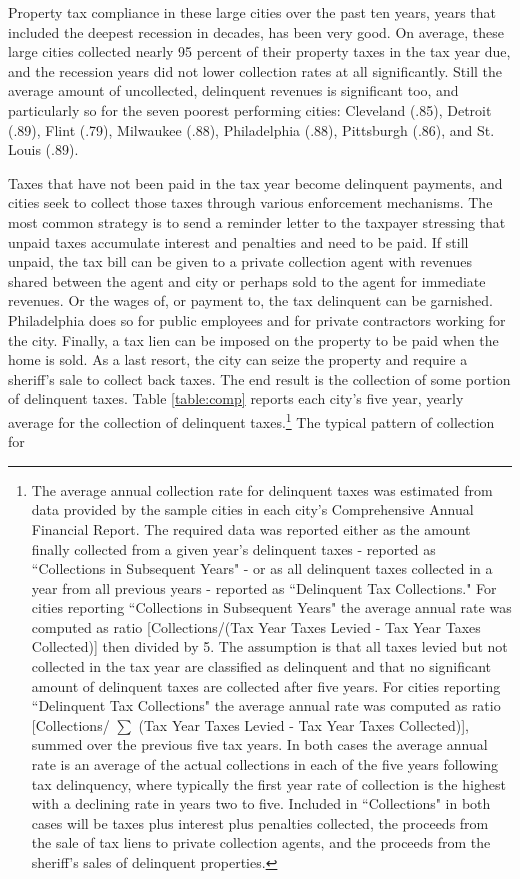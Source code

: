 \documentclass[12pt,titlepage]{article}
\begin{document}
Property tax compliance in these large cities over the past ten years,
years that included the deepest recession in decades, has been very
good.  On average, these large cities collected nearly 95 percent of
their property taxes in the tax year due, and the recession years did
not lower collection rates at all significantly.  Still the average
amount of uncollected, delinquent revenues is significant too, and
particularly so for the seven poorest performing cities: Cleveland
(.85), Detroit (.89), Flint (.79), Milwaukee (.88), Philadelphia
(.88), Pittsburgh (.86), and St. Louis (.89).

Taxes that have not been paid in the tax year become delinquent
payments, and cities seek to collect those taxes through various
enforcement mechanisms.  The most common strategy is to send a
reminder letter to the taxpayer stressing that unpaid taxes accumulate
interest and penalties and need to be paid.  If still unpaid, the tax
bill can be given to a private collection agent with revenues shared
between the agent and city or perhaps sold to the agent for immediate
revenues.  Or the wages of, or payment to, the tax delinquent can be
garnished.  Philadelphia does so for public employees and for private
contractors working for the city.  Finally, a tax lien can be imposed
on the property to be paid when the home is sold.  As a last resort,
the city can seize the property and require a sheriff's sale to
collect back taxes.  The end result is the collection of some portion
of delinquent taxes.  Table \ref{table:comp} reports each city's five year, yearly
average for the collection of delinquent taxes.\footnote{The average
  annual collection rate for delinquent taxes was estimated from data
  provided by the sample cities in each city's Comprehensive Annual
  Financial Report.  The required data was reported either as the
  amount finally collected from a given year's delinquent taxes -
  reported as ``Collections in Subsequent Years" - or as all
  delinquent taxes collected in a year from all previous years -
  reported as ``Delinquent Tax Collections."  For cities reporting
  ``Collections in Subsequent Years" the average annual rate was
  computed as ratio [Collections/(Tax Year Taxes Levied - Tax Year
    Taxes Collected)] then divided by 5.  The assumption is that all
  taxes levied but not collected in the tax year are classified as
  delinquent and that no significant amount of delinquent taxes are
  collected after five years.  For cities reporting ``Delinquent Tax
  Collections" the average annual rate was computed as ratio
  [Collections/ $\sum$ (Tax Year Taxes Levied - Tax Year Taxes
    Collected)], summed over the previous five tax years.  In both
  cases the average annual rate is an average of the actual
  collections in each of the five years following tax delinquency,
  where typically the first year rate of collection is the highest
  with a declining rate in years two to five.  Included in
  ``Collections" in both cases will be taxes plus interest plus
  penalties collected, the proceeds from the sale of tax liens to
  private collection agents, and the proceeds from the sheriff's sales
  of delinquent properties.} The typical pattern of collection for
\end{document}
